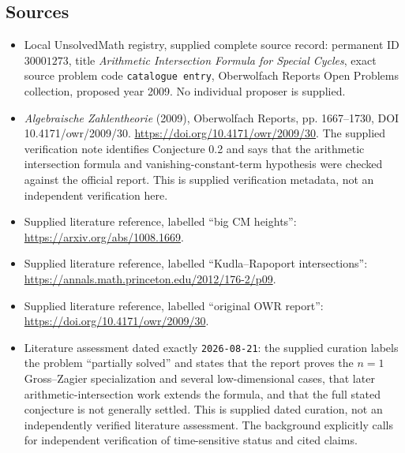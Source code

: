 \documentclass[11pt]{article}
\begin{document}
\subsection{Sources}
\begin{itemize}
\item Local UnsolvedMath registry, supplied complete source record: permanent ID \(30001273\), title \emph{Arithmetic Intersection Formula for Special Cycles}, exact source problem code \texttt{catalogue entry}, Oberwolfach Reports Open Problems collection, proposed year 2009. No individual proposer is supplied.
\item \emph{Algebraische Zahlentheorie} (2009), Oberwolfach Reports, pp. 1667--1730, DOI 10.4171/owr/2009/30. \url{https://doi.org/10.4171/owr/2009/30}. The supplied verification note identifies Conjecture 0.2 and says that the arithmetic intersection formula and vanishing-constant-term hypothesis were checked against the official report. This is supplied verification metadata, not an independent verification here.
\item Supplied literature reference, labelled ``big CM heights'': \url{https://arxiv.org/abs/1008.1669}.
\item Supplied literature reference, labelled ``Kudla--Rapoport intersections'': \url{https://annals.math.princeton.edu/2012/176-2/p09}.
\item Supplied literature reference, labelled ``original OWR report'': \url{https://doi.org/10.4171/owr/2009/30}.
\item Literature assessment dated exactly \texttt{2026-08-21}: the supplied curation labels the problem ``partially solved'' and states that the report proves the \(n=1\) Gross--Zagier specialization and several low-dimensional cases, that later arithmetic-intersection work extends the formula, and that the full stated conjecture is not generally settled. This is supplied dated curation, not an independently verified literature assessment. The background explicitly calls for independent verification of time-sensitive status and cited claims.
\end{itemize}
\end{document}
